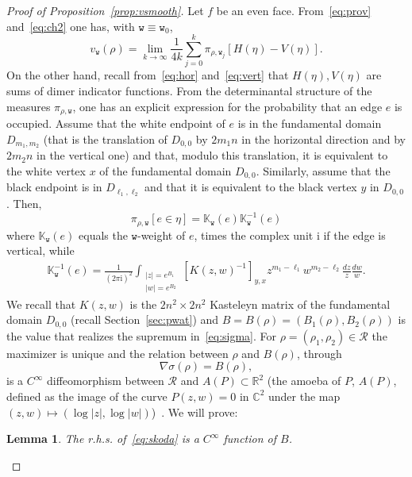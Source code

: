 \documentclass[10pt]{amsart}
\newtheorem{lemm}[theo]{Lemma}\newtheorem{prop}[theo]{Proposition}\newtheorem{coro}[theo]{Corollary}\newtheorem{conj}[theo]{Conjecture}
\theoremstyle{definition}\newtheorem{defi}[theo]{Definition}\newtheorem{rema}[theo]{Remark}\newtheorem{exam}[theo]{Example}\newtheorem{exem}[theo]{Example}\newtheorem{nota}[theo]{Notation}
\newcommand{\ttw}{\mathtt{w}}
\newcommand{\bbC}{\mathbb{C}}
\newcommand{\bbR}{\mathbb{R}}
\newcommand{\bbK}{\mathbb{K}}
\newcommand{\clR}{\mathcal{R}}
\newcommand{\rmi}{\mathrm{i}}
\begin{document}
\begin{proof}[{Proof of Proposition~\ref{prop:vsmooth}}]
Let $f$ be an even face. From~\eqref{eq:prov} and~\eqref{eq:ch2} one has, with $\ttw\equiv \ttw_0$,
\begin{equation}\label{eq:cisiamoquasi}
v_{\ttw}(\rho)=\lim_{k\to\infty}\frac1{4k} \sum_{j=0}^k\pi_{\rho,\ttw_j}\left[H(\eta)-V(\eta)\right].
\end{equation}
On the other hand, recall from~\eqref{eq:hor} and~\eqref{eq:vert} that $H(\eta),V(\eta)$ are sums of dimer indicator functions. From the determinantal structure of the measures $\pi_{\rho,\ttw}$, one has an explicit expression for the probability that an edge $e$ is occupied. Assume that the white endpoint of $e$ is in the fundamental domain $D_{m_1,m_2}$ (that is the translation of $D_{0,0}$ by $2m_1 n$ in the horizontal direction and by $2 m_2 n$ in the vertical one) and that, modulo this translation, it is equivalent to the white vertex $x$ of the fundamental domain $D_{0,0}$. Similarly, assume that the black endpoint is in $D_{\ell_1,\ell_2}$ and that it is equivalent to the black vertex $y$ in $D_{0,0}$. Then,
\begin{equation}\label{eq:Ksol}
\pi_{\rho,\ttw}[e\in \eta]= \bbK_{\ttw}(e)\bbK^{-1}_{\ttw}(e)
\end{equation}
where $\bbK_{\ttw}(e)$ equals the $\ttw$-weight of $e$, times the complex unit $\rmi$ if the edge is vertical, while
\begin{align}\label{eq:skoda}
\bbK_{\ttw}^{-1}(e)= \frac1{(2\pi \rmi)^2}\int_{\substack{ |z|=e^{B_1} \\|w|=e^{B_2}}} \left[K(z,w)^{-1}\right]_{y,x} z^{m_1-\ell_1}w^{m_2-\ell_2}\frac{dz}{z} \frac{dw}{w}.
\end{align}
We recall that $K(z,w)$ is the $2 n^2\times 2n^2$ Kasteleyn matrix of the fundamental domain $D_{0,0}$ (recall Section~\ref{sec:pwat}) and $B=B(\rho)= (B_1(\rho),B_2(\rho))$ is the value that realizes the supremum in~\eqref{eq:sigma}. For $\rho=(\rho_1,\rho_2)\in \clR$ the maximizer is unique and the relation between $\rho$ and $B(\rho)$, through
\begin{equation}\label{eq:srBr}
\nabla \sigma(\rho)=B(\rho),
\end{equation}
is a $C^\infty$ diffeomorphism between $\clR$ and $A(P)\subset \bbR^2$ (the amoeba of $P$, $A(P)$, defined as the image of the curve $P(z,w)=0$ in $\bbC^2$ under the map $(z,w)\mapsto (\log |z|, \log |w|)$)~\cite{Kenyon2003}. We will prove:
\begin{lemm}\label{lemma:Cinft}
The r.h.s. of~\eqref{eq:skoda} is a $C^\infty$ function of $B$.
\end{lemm}


\end{proof}
\end{document}
